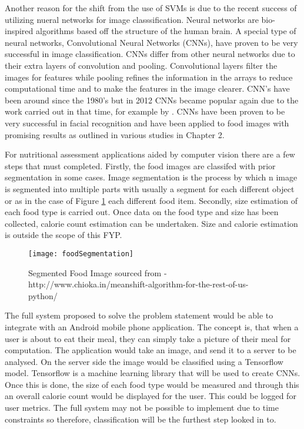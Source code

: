 Another reason for the shift from the use of SVMs is due to the recent success of utilizing nueral networks for image classsification.
Neural networks are bio-inspired algorithms based off the structure of the human brain.
A special type of neural networks, Convolutional Neural Networks (CNNs), have proven to be very successful in image classification.
CNNs differ from other neural networks due to their extra layers of convolution and pooling.
Convolutional layers filter the images for features while pooling refines the information in the arrays to reduce computational time and to make the features in the image clearer.
CNN's have been around since the 1980's \textcite{handsOnML} but in 2012 CNNs became popular again due to the work carried out in that time, for example by \textcite{krizhevsky2012imagenet}.
CNNs have been proven to be very successful in facial recognition and have been applied to food images with promising results as outlined in various studies in Chapter 2.

For nutritional assessment applications aided by computer vision there are a few steps that must completed. Firstly, the food images are classifed with prior segmentation in some cases.
Image segmentation is the process by which n image is segmented into multiple parts with usually a segment for each different object or as in the case of Figure \ref{fig:foodSegment} each different food item.
Secondly, size estimation of each food type is carried out. Once data on the food type and size has been collected, calorie count estimation can be undertaken. Size and calorie estimation is outside the scope of this FYP.

\begin{figure}[h]
  \centering
  \texttt{[image: foodSegmentation]}
  \caption{Segmented Food Image sourced from - http://www.chioka.in/meanshift-algorithm-for-the-rest-of-us-python/}
  \label{fig:foodSegment}
\end{figure}


The full system proposed to solve the problem statement would be able to integrate with an Android mobile phone application.
The concept is, that when a user is about to eat their meal, they can simply take a picture of their meal for computation.
The application would take an image, and send it to a server to be analysed.
On the server side the image would be classified using a Tensorflow model.
Tensorflow is a machine learning library that will be used to create CNNs.
Once this is done, the size of each food type would be measured and through this an overall calorie count would be displayed for the user.
This could be logged for user metrics.
The full system may not be possible to implement due to time constraints so therefore, classification will be the furthest step looked in to.

